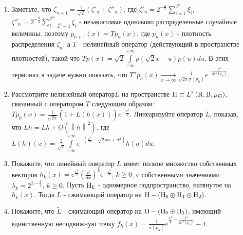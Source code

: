 $ $
\begin{ordre}
$ $
\begin{enumerate}

\item Заметьте, что $\zeta _{n+1} =\frac{1}{\sqrt 2 }\left( {\zeta '_n 
+\zeta ''_n } \right)$, где $\zeta '_n 
=2^{-\frac{n}{2}}\sum\limits_{i=1}^{2^n} {\xi _i } $, $\zeta ''_n 
=2^{-\frac{n}{2}}\sum\limits_{i=2^n+1}^{2^{2n}} {\xi _i } $ - независимые 
одинаково распределенные случайные величины, поэтому $p_{n+1} (x)=Tp_n (x)$, 
где $p_n (x)$ - плотность распределения $\zeta _n $, а $T$ - нелинейный 
оператор (действующий в пространстве плотностей), такой что $Tp(x)=\sqrt 2 
\int\limits_{-\infty }^{+\infty } {p(\sqrt 2 x-u)p(u)du} $. В этих терминах 
в задаче нужно показать, что $T^np_h (x)\mathop \to \limits_{n\to \infty } 
\frac{1}{\sqrt {2\pi } \sigma (p_h )}e^{-\frac{x^2}{2\sigma ^2(p_h )}}$. 

\item Рассмотрите нелинейный оператор$\tilde {L}$ на пространстве ${\rm 
H}\equiv L^2\left( {{\rm R},{\rm B},\mu _G } \right)$, связанный с 
оператором $T$ следующим образом: $Tp_h (x)=\frac{1}{\sqrt {2\pi } }\left( 
{1+\tilde {L}\left( {h(x)} \right)} \right)e^{-\frac{x^2}{2}}$. Линеаризуйте 
оператор $\tilde {L}$, показав, что $\tilde {L}h=Lh+O\left( {\left\| h 
\right\|^2} \right)$, где $L(h)(x)=\frac{2}{\sqrt \pi }\int\limits_{-\infty 
}^{+\infty } {e^{-\left( {\frac{x^2}{2}-\sqrt 2 xu+u^2} \right)}h(u)du} $.

\item Покажите, что линейный оператор $L$ имеет полное множество собственных 
векторов $h_k (x)=e^{\frac{x^2}{2}}\left( {\frac{d}{dx}} 
\right)^ke^{-\frac{x^2}{2}}$, $k\ge 0$, с собственными значениями $\lambda 
_k =2^{1-\frac{k}{2}}$, $k\ge 0$. Пусть ${\rm H}_k $ - одномерное 
подпространство, натянутое на $h_k (x)$. Тогда $L$ - сжимающий оператор на 
${\rm H}-\left( {{\rm H}_0 \oplus {\rm H}_1 \oplus {\rm H}_2 } \right)$.

\item Покажите, что $\tilde {L}$ - сжимающий оператор на ${\rm H}-\left( {{\rm 
H}_0 \oplus {\rm H}_1 } \right)$, имеющий единственную неподвижную точку 
$f_h (x)=\frac{1}{\sigma (p_h )}e^{\frac{x^2}{2}-\frac{x^2}{2\sigma ^2(p_h 
)}}-1$.


\end{enumerate}

\end{ordre}



